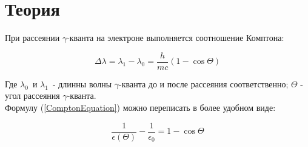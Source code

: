 

\newcommand{\formula}[2]
{
    \begin{equation}\label{#1}
        #2
    \end{equation}
}

\newcommand{\mth}[1]
{
    \begin{math}
        #1
    \end{math}
}

\newcommand{\ruB}[1]
{
    _{\text{#1}}
}

\setcounter{PicsCounter}{1}

\newcommand{\pic}[3]{
    \begin{center}
        \begin{minipage}[h!]{#1}
            \begin{center}

                \texttt{[image: \#2]}
                \textit{Рис \arabic{PicsCounter}. #3}

            \end{center}
        \end{minipage}
    \end{center}

    \stepcounter{PicsCounter}
}

\setcounter{TablesCounter}{1}

\newcommand{\tableLable}[1]{
    \textit{Таблица \arabic{TablesCounter}: #1}

    \stepcounter{TablesCounter}
}

\section{Теория}

При рассеянии $ \gamma $-кванта на электроне выполняется соотношение Комптона:

\formula{ComptonEquation}
{ \Delta\lambda = \lambda_1 - \lambda_0 = \frac{h}{mc}\left( 1 - \cos{\Theta} \right) }

Где $ \lambda_0 \, $ и $ \lambda_1 \, $ - длинны волны $ \gamma $-кванта до и после
рассеяния соответственно; $ \Theta $ - угол рассеяния  $ \gamma $-кванта. \\

Формулу (\ref{ComptonEquation}) можно переписать в более удобном виде:

\formula{TransformedComptonEquation}
{ \frac{1}{\epsilon{\left( \Theta \right)}} - \frac{1}{\epsilon_0} = 1 - \cos{\Theta} }

